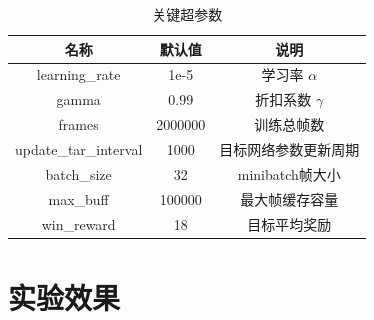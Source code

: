 \documentclass[a4paper,12pt]{article}
\begin{document}
\begin{CJK}{UTF8}{gbsn}
\begin{table}[!h]
	\renewcommand{\arraystretch}{1.2}
	\caption{关键超参数}
	\centering
	\begin{tabular}{ccc}
		\hline
		名称& 默认值& 说明\\
		\hline
		learning\_rate& 1e-5 & 学习率 $\alpha$\\
		gamma& 0.99 & 折扣系数 $\gamma$\\
		frames& 2000000 & 训练总帧数\\
		update\_tar\_interval& 1000 & 目标网络参数更新周期 \\
		batch\_size& 32 & minibatch帧大小\\
		max\_buff& 100000 & 最大帧缓存容量 \\
		win\_reward& 18 & 目标平均奖励 \\
		\hline
	\end{tabular}
\end{table}
\section{实验效果}

\end{CJK}
\end{document}
